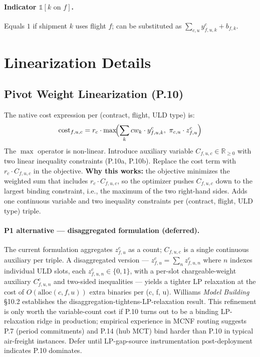 \documentclass[11pt,a4paper]{article}
\theoremstyle{definition}
\begin{document}
\paragraph{Indicator $\mathbb{1}[k \text{ on } f]$.}
Equals $1$ if shipment $k$ uses flight $f$; can be substituted as $\sum_{c,u} y_{f,u,k}^c + b_{f,k}$.

\section{Linearization Details}
\label{sec:linearization}

\subsection{Pivot Weight Linearization (P.10)}

The native cost expression per (contract, flight, ULD type) is:
\[
  \text{cost}_{f,u,c} = r_c \cdot \max\!\Bigl(\sum_k cw_k \cdot y_{f,u,k}^c,\ \pi_{c,u} \cdot z_{f,u}^c\Bigr)
\]
The $\max$ operator is non-linear. Introduce auxiliary variable $C_{f,u,c} \in \mathbb{R}_{\geq 0}$
with two linear inequality constraints (P.10a, P.10b). Replace the cost term with $r_c \cdot C_{f,u,c}$
in the objective. \textbf{Why this works:} the objective minimizes the weighted sum that includes
$r_c \cdot C_{f,u,c}$, so the optimizer pushes $C_{f,u,c}$ down to the largest binding
constraint, i.e., the maximum of the two right-hand sides. Adds one continuous variable and
two inequality constraints per (contract, flight, ULD type) triple.

\paragraph{P1 alternative --- disaggregated formulation (deferred).}
The current formulation aggregates $z_{f,u}^c$ as a count; $C_{f,u,c}$ is a single
continuous auxiliary per triple. A disaggregated version --- $z_{f,u}^c = \sum_n z^c_{f,u,n}$
where $n$ indexes individual ULD slots, each $z^c_{f,u,n} \in \{0,1\}$, with a
per-slot chargeable-weight auxiliary $C^c_{f,u,n}$ and two-sided inequalities ---
yields a tighter LP relaxation at the cost of $O(\text{alloc}(c, f, u))$ extra
binaries per (c, f, u). Williams \emph{Model Building} \S10.2 establishes the
disaggregation-tightens-LP-relaxation result. This refinement is only worth the
variable-count cost if P.10 turns out to be a binding LP-relaxation ridge in
production; empirical experience in MCNF routing suggests P.7 (period commitments)
and P.14 (hub MCT) bind harder than P.10 in typical air-freight instances. Defer
until LP-gap-source instrumentation post-deployment indicates P.10 dominates.
\end{document}
